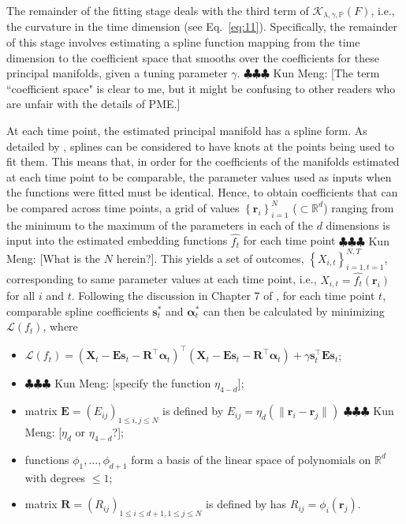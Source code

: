 \documentclass[11pt,reqno]{article}
\newcommand{\T}{\intercal}
\newcommand{\meng}[1]{{\color{purple} \sf $\clubsuit\clubsuit\clubsuit$ Kun Meng: [#1]}}
\theoremstyle{definition}
\begin{document}
The remainder of the fitting stage deals with the third term of $\mathcal{K}_{\lambda, \gamma, \mathbb{P}}(F)$, i.e., the curvature in the time dimension (see Eq.~\eqref{eq:11}). Specifically, the remainder of this stage involves estimating a spline function mapping from the time dimension to the coefficient space that smooths over the coefficients for these principal manifolds, given a tuning parameter $\gamma$. \meng{The term ``coefficient space" is clear to me, but it might be confusing to other readers who are unfair with the details of PME.}

At each time point, the estimated principal manifold has a spline form. As detailed by \cite{greenSilverman1994}, splines can be considered to have knots at the points being used to fit them. This means that, in order for the coefficients of the manifolds estimated at each time point to be comparable, the parameter values used as inputs when the functions were fitted must be identical. Hence, to obtain coefficients that can be compared across time points, a grid of values $\left\{\boldsymbol{r}_i\right\}_{i=1}^{N}$ ($\subset\mathbb{R}^d$) ranging from the minimum to the maximum of the parameters in each of the $d$ dimensions is input into the estimated embedding functions $\widehat{f_t}$ for each time point  \meng{What is the $N$ herein?}. This yields a set of outcomes, $\left\{X_{i,t}\right\}_{i=1, t = 1}^{N, T}$, corresponding to same parameter values at each time point, i.e., $X_{i,t}=\widehat{f_t}(\boldsymbol{r}_i)$ for all $i$ and $t$. Following the discussion in Chapter 7 of \cite{greenSilverman1994}, for each time point $t$, comparable spline coefficients $\boldsymbol{s}_t^*$ and $\boldsymbol{\alpha}_t^*$ can then be calculated by minimizing $\mathcal{L}(f_t)$, where
\begin{itemize}
    \item $\mathcal{L}(f_t) = (\boldsymbol{X}_t - \boldsymbol{E}\boldsymbol{s}_t - \boldsymbol{R}^\T\boldsymbol{\alpha}_t)^\T(\boldsymbol{X}_t - \boldsymbol{E}\boldsymbol{s}_t - \boldsymbol{R}^\T\boldsymbol{\alpha}_t) + \gamma\boldsymbol{s}_t^\T \boldsymbol{E}\boldsymbol{s}_t$;
    \item \meng{specify the function $\eta_{4-d}$};
    \item matrix $\boldsymbol{E}=(E_{ij})_{1\le i,j\le N}$ is defined by $E_{ij} = \eta_{d}(\|\boldsymbol{r}_i - \boldsymbol{r}_j\|)$ \meng{$\eta_d$ or $\eta_{4-d}$?};
    \item functions $\phi_1,\ldots,\phi_{d+1}$ form a basis of the linear space of polynomials on $\mathbb{R}^d$ with degrees $\le1$;
    \item matrix $\boldsymbol{R}=(R_{ij})_{1\le i\le d+1,1\le j\le N}$ is defined by has $R_{ij} = \phi_i(\boldsymbol{r}_j)$.
\end{itemize}
\end{document}
